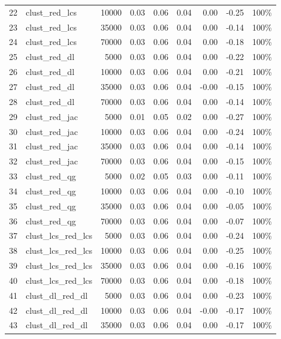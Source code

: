 \documentclass{praca1}
\begin{document}
\begin{table}[!h]
\begin{tabular}{|rlr|rrr|rr|r|}
  22 & clust\_red\_lcs & 10000 & 0.03 & 0.06 & 0.04 & 0.00 & -0.25 & 100\% \\ 
  23 & clust\_red\_lcs & 35000 & 0.03 & 0.06 & 0.04 & 0.00 & -0.14 & 100\% \\ 
  24 & clust\_red\_lcs & 70000 & 0.03 & 0.06 & 0.04 & 0.00 & -0.18 & 100\% \\ 
   \hline
25 & clust\_red\_dl & 5000 & 0.03 & 0.06 & 0.04 & 0.00 & -0.22 & 100\% \\ 
  26 & clust\_red\_dl & 10000 & 0.03 & 0.06 & 0.04 & 0.00 & -0.21 & 100\% \\ 
  27 & clust\_red\_dl & 35000 & 0.03 & 0.06 & 0.04 & -0.00 & -0.15 & 100\% \\ 
  28 & clust\_red\_dl & 70000 & 0.03 & 0.06 & 0.04 & 0.00 & -0.14 & 100\% \\ 
   \hline
29 & clust\_red\_jac & 5000 & 0.01 & 0.05 & 0.02 & 0.00 & -0.27 & 100\% \\ 
  30 & clust\_red\_jac & 10000 & 0.03 & 0.06 & 0.04 & 0.00 & -0.24 & 100\% \\ 
  31 & clust\_red\_jac & 35000 & 0.03 & 0.06 & 0.04 & 0.00 & -0.14 & 100\% \\ 
  32 & clust\_red\_jac & 70000 & 0.03 & 0.06 & 0.04 & 0.00 & -0.15 & 100\% \\ 
   \hline
33 & clust\_red\_qg & 5000 & 0.02 & 0.05 & 0.03 & 0.00 & -0.11 & 100\% \\ 
  34 & clust\_red\_qg & 10000 & 0.03 & 0.06 & 0.04 & 0.00 & -0.10 & 100\% \\ 
  35 & clust\_red\_qg & 35000 & 0.03 & 0.06 & 0.04 & 0.00 & -0.05 & 100\% \\ 
  36 & clust\_red\_qg & 70000 & 0.03 & 0.06 & 0.04 & 0.00 & -0.07 & 100\% \\ 
   \hline
37 & clust\_lcs\_red\_lcs & 5000 & 0.03 & 0.06 & 0.04 & 0.00 & -0.24 & 100\% \\ 
  38 & clust\_lcs\_red\_lcs & 10000 & 0.03 & 0.06 & 0.04 & 0.00 & -0.25 & 100\% \\ 
  39 & clust\_lcs\_red\_lcs & 35000 & 0.03 & 0.06 & 0.04 & 0.00 & -0.16 & 100\% \\ 
  40 & clust\_lcs\_red\_lcs & 70000 & 0.03 & 0.06 & 0.04 & 0.00 & -0.18 & 100\% \\ 
   \hline
41 & clust\_dl\_red\_dl & 5000 & 0.03 & 0.06 & 0.04 & 0.00 & -0.23 & 100\% \\ 
  42 & clust\_dl\_red\_dl & 10000 & 0.03 & 0.06 & 0.04 & -0.00 & -0.17 & 100\% \\ 
  43 & clust\_dl\_red\_dl & 35000 & 0.03 & 0.06 & 0.04 & 0.00 & -0.17 & 100\% \\ 

\end{tabular}
\end{table}
\end{document}
